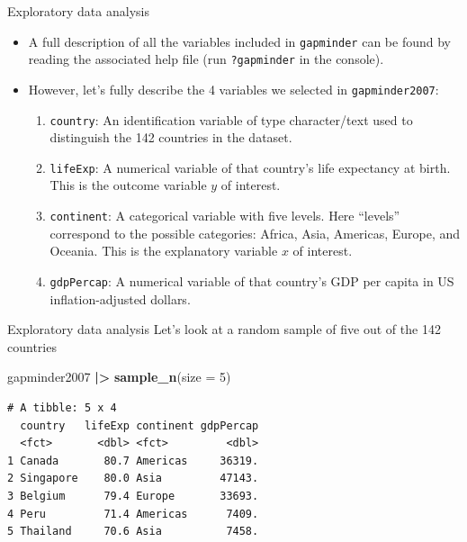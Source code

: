 \documentclass[
  ignorenonframetext,
]{beamer}
\newenvironment{Shaded}{\begin{snugshade}}{\end{snugshade}}
\newcommand{\AttributeTok}[1]{\textcolor[rgb]{0.13,0.29,0.53}{#1}}
\newcommand{\DecValTok}[1]{\textcolor[rgb]{0.00,0.00,0.81}{#1}}
\newcommand{\FunctionTok}[1]{\textcolor[rgb]{0.13,0.29,0.53}{\textbf{#1}}}
\newcommand{\NormalTok}[1]{#1}
\newcommand{\SpecialCharTok}[1]{\textcolor[rgb]{0.81,0.36,0.00}{\textbf{#1}}}
\begin{document}
\begin{frame}[fragile]{Exploratory data analysis}
\label{exploratory-data-analysis-1}
\begin{itemize}
\item
  A full description of all the variables included in \texttt{gapminder}
  can be found by reading the associated help file (run
  \texttt{?gapminder} in the console).
\item
  However, let's fully describe the 4 variables we selected in
  \texttt{gapminder2007}:

  \begin{enumerate}
  \item
    \texttt{country}: An identification variable of type character/text
    used to distinguish the 142 countries in the dataset.
  \item
    \texttt{lifeExp}: A numerical variable of that country's life
    expectancy at birth. This is the outcome variable \(y\) of interest.
  \item
    \texttt{continent}: A categorical variable with five levels. Here
    ``levels'' correspond to the possible categories: Africa, Asia,
    Americas, Europe, and Oceania. This is the explanatory variable
    \(x\) of interest.
  \item
    \texttt{gdpPercap}: A numerical variable of that country's GDP per
    capita in US inflation-adjusted dollars.
  \end{enumerate}
\end{itemize}
\end{frame}

\begin{frame}[fragile]{Exploratory data analysis}
\label{exploratory-data-analysis-2}
Let's look at a random sample of five out of the 142 countries

\begin{Shaded}
\begin{Highlighting}[]
\NormalTok{gapminder2007 }\SpecialCharTok{|\textgreater{}} 
  \FunctionTok{sample\_n}\NormalTok{(}\AttributeTok{size =} \DecValTok{5}\NormalTok{)}
\end{Highlighting}
\end{Shaded}

\begin{verbatim}
# A tibble: 5 x 4
  country   lifeExp continent gdpPercap
  <fct>       <dbl> <fct>         <dbl>
1 Canada       80.7 Americas     36319.
2 Singapore    80.0 Asia         47143.
3 Belgium      79.4 Europe       33693.
4 Peru         71.4 Americas      7409.
5 Thailand     70.6 Asia          7458.
\end{verbatim}
\end{frame}
\end{document}
